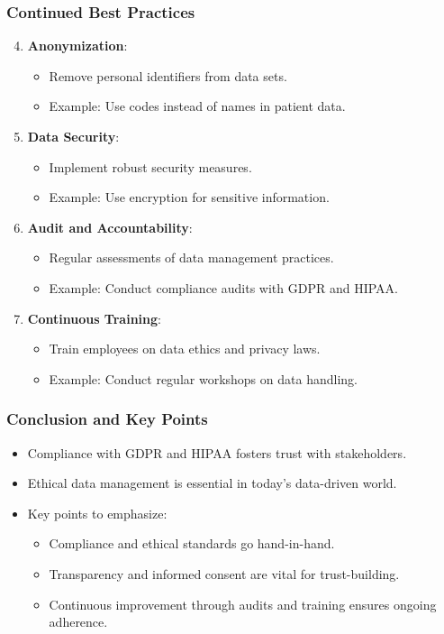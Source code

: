 \documentclass[aspectratio=169]{beamer}
\begin{document}
\begin{frame}[fragile]
    \frametitle{Continued Best Practices}
    \begin{enumerate}
        \setcounter{enumi}{3} %
        \item \textbf{Anonymization}:
            \begin{itemize}
                \item Remove personal identifiers from data sets.
                \item Example: Use codes instead of names in patient data.
            \end{itemize}
        \item \textbf{Data Security}:
            \begin{itemize}
                \item Implement robust security measures.
                \item Example: Use encryption for sensitive information.
            \end{itemize}
        \item \textbf{Audit and Accountability}:
            \begin{itemize}
                \item Regular assessments of data management practices.
                \item Example: Conduct compliance audits with GDPR and HIPAA.
            \end{itemize}
        \item \textbf{Continuous Training}:
            \begin{itemize}
                \item Train employees on data ethics and privacy laws.
                \item Example: Conduct regular workshops on data handling.
            \end{itemize}
    \end{enumerate}
\end{frame}

\begin{frame}[fragile]
    \frametitle{Conclusion and Key Points}
    \begin{itemize}
        \item Compliance with GDPR and HIPAA fosters trust with stakeholders.
        \item Ethical data management is essential in today's data-driven world.
        \item Key points to emphasize:
            \begin{itemize}
                \item Compliance and ethical standards go hand-in-hand.
                \item Transparency and informed consent are vital for trust-building.
                \item Continuous improvement through audits and training ensures ongoing adherence.
            \end{itemize}
    \end{itemize}
\end{frame}
\end{document}
